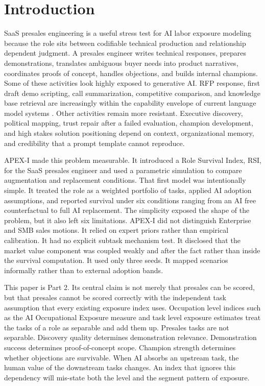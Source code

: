 \documentclass[10pt,conference]{IEEEtran}
\begin{document}
\section{Introduction}
SaaS presales engineering is a useful stress test for AI labor exposure modeling because the role sits between codifiable technical production and relationship dependent judgment. A presales engineer writes technical responses, prepares demonstrations, translates ambiguous buyer needs into product narratives, coordinates proofs of concept, handles objections, and builds internal champions. Some of these activities look highly exposed to generative AI. RFP response, first draft demo scripting, call summarization, competitive comparison, and knowledge base retrieval are increasingly within the capability envelope of current language model systems \cite{eloundou2023gpts}. Other activities remain more resistant. Executive discovery, political mapping, trust repair after a failed evaluation, champion development, and high stakes solution positioning depend on context, organizational memory, and credibility that a prompt template cannot reproduce.

APEX-I made this problem measurable. It introduced a Role Survival Index, RSI, for the SaaS presales engineer and used a parametric simulation to compare augmentation and replacement conditions. That first model was intentionally simple. It treated the role as a weighted portfolio of tasks, applied AI adoption assumptions, and reported survival under six conditions ranging from an AI free counterfactual to full AI replacement. The simplicity exposed the shape of the problem, but it also left six limitations. APEX-I did not distinguish Enterprise and SMB sales motions. It relied on expert priors rather than empirical calibration. It had no explicit subtask mechanism test. It disclosed that the market value component was coupled weakly and after the fact rather than inside the survival computation. It used only three seeds. It mapped scenarios informally rather than to external adoption bands.

This paper is Part 2. Its central claim is not merely that presales can be scored, but that presales cannot be scored correctly with the independent task assumption that every existing exposure index uses. Occupation level indices such as the AI Occupational Exposure measure \cite{felten2021occupational} and task level exposure estimates \cite{eloundou2023gpts} treat the tasks of a role as separable and add them up. Presales tasks are not separable. Discovery quality determines demonstration relevance. Demonstration success determines proof-of-concept scope. Champion strength determines whether objections are survivable. When AI absorbs an upstream task, the human value of the downstream tasks changes. An index that ignores this dependency will mis-state both the level and the segment pattern of exposure.
\end{document}
